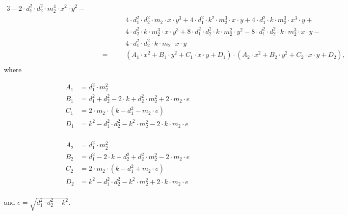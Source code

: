 \begin{alignat*}{3}
    - 2 \cdot d_1^2 \cdot d_2^2 \cdot m_2^4 \cdot x^2 \cdot y^2 -\\
  & && && 4 \cdot d_1^2 \cdot d_2^2 \cdot m_2 \cdot x \cdot y^3
    + 4 \cdot d_1^2 \cdot k^2 \cdot m_2^3 \cdot x \cdot y
    + 4 \cdot d_1^2 \cdot k \cdot m_2^3 \cdot x^3 \cdot y +\\
  & && && 4 \cdot d_2^2 \cdot k \cdot m_2^3 \cdot x \cdot y^3
    + 8 \cdot d_1^2 \cdot d_2^2 \cdot k \cdot m_2^2 \cdot y^2
    - 8 \cdot d_1^2 \cdot d_2^2 \cdot k \cdot m_2^3 \cdot x \cdot y -\\
  & && && 4 \cdot d_1^2 \cdot d_2^2 \cdot k \cdot m_2 \cdot x \cdot y\\
  & && =\quad && (A_1\cdot x^2 + B_1\cdot y^2 + C_1\cdot x \cdot y + D_1)\cdot
    (A_2\cdot x^2 + B_2\cdot y^2 + C_2\cdot x \cdot y + D_2),\\
  \end{alignat*}
%
where\\
\begin{minipage}[c]{0.5\textwidth}
\begin{align*}
  A_1 &= d_1^2\cdot m_2^2\\
  B_1 &= d_1^2+d_2^2-2\cdot k+d_2^2\cdot m_2^2+2\cdot m_2\cdot e\\
  C_1 &= 2\cdot m_2\cdot (k - d_1^2 - m_2\cdot e)\\
  D_1 &= k^2 - d_1^2\cdot d_2^2 - k^2\cdot m_2^2 - 2\cdot k\cdot m_2\cdot e\\
\end{align*}
\end{minipage}
%
\begin{minipage}[c]{0.5\textwidth}
\begin{align*}
  A_2 &= d_1^2\cdot m_2^2\\
  B_2 &= d_1^2 - 2\cdot k + d_2^2 + d_2^2\cdot m_2^2 - 2\cdot m_2\cdot  e\\
  C_2 &= 2\cdot m_2\cdot (k - d_1^2 + m_2\cdot  e)\\
  D_2 &= k^2 - d_1^2\cdot d_2^2 - k^2\cdot m_2^2 + 2\cdot k\cdot m_2\cdot e\\
\end{align*}
\end{minipage}
and $e = \sqrt{d_1^2\cdot d_2^2 - k^2}$.
